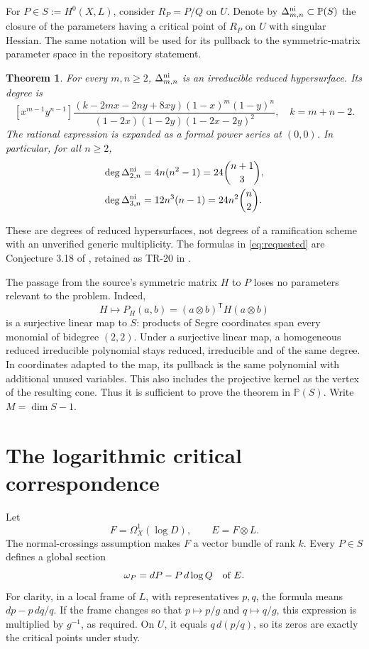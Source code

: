 \documentclass[11pt]{article}
\newtheorem{theorem}{Theorem}
\newcommand{\PP}{\mathbb P}
\begin{document}
For $P\in S:=H^0(X,L)$, consider $R_P=P/Q$ on $U$. Denote by
$\Delta^{\rm ni}_{m,n}\subset\PP(S)$ the closure of the parameters
having a critical point of $R_P$ on $U$ with singular Hessian.
The same notation will be used for its pullback to the symmetric-matrix
parameter space in the repository statement.

\begin{theorem}\label{thm:general}
For every $m,n\ge2$, $\Delta^{\rm ni}_{m,n}$ is an irreducible reduced
hypersurface. Its degree is
\begin{equation}\label{eq:general}
\boxed{
 [x^{m-1}y^{n-1}]
 \frac{(k-2mx-2ny+8xy)(1-x)^m(1-y)^n}
 {(1-2x)(1-2y)(1-2x-2y)^2},\quad k=m+n-2.
}
\end{equation}
The rational expression is expanded as a formal power series at $(0,0)$.
In particular, for all $n\ge2$,
\begin{equation}\label{eq:requested}
 \begin{split}
 \deg\Delta^{\rm ni}_{2,n}&=4n(n^2-1)=24\binom{n+1}{3},\\
 \deg\Delta^{\rm ni}_{3,n}&=12n^3(n-1)=24n^2\binom n2.
 \end{split}
\end{equation}
\end{theorem}

These are degrees of reduced hypersurfaces, not degrees of a
ramification scheme with an unverified generic multiplicity. The
formulas in \eqref{eq:requested} are Conjecture 3.18 of
\cite{BFHP}, retained as TR-20 in \cite{repo}.

The passage from the source's symmetric matrix $H$ to $P$ loses no
parameters relevant to the problem. Indeed,
\[
 H\longmapsto P_H(a,b)=(a\otimes b)^{\mathsf T}H(a\otimes b)
\]
is a surjective linear map to $S$: products of Segre coordinates
span every monomial of bidegree $(2,2)$. Under a surjective linear
map, a homogeneous reduced irreducible polynomial stays reduced,
irreducible and of the same degree. In coordinates adapted to the
map, its pullback is the same polynomial with additional unused
variables. This also includes the projective kernel as the vertex
of the resulting cone. Thus it is sufficient to prove the theorem
in $\PP(S)$. Write $M=\dim S-1$.

\section{The logarithmic critical correspondence}
Let
\[
 F=\Omega_X^1(\log D),\qquad E=F\otimes L.
\]
The normal-crossings assumption makes $F$ a vector bundle of rank $k$.
Every $P\in S$ defines a global section
\begin{equation}\label{eq:omega}
 \omega_P=dP-P\,d\log Q\quad\hbox{of }E.
\end{equation}
For clarity, in a local frame of $L$, with representatives $p,q$, the
formula means $dp-p\,dq/q$. If the frame changes so that
$p\mapsto p/g$ and $q\mapsto q/g$, this expression is multiplied by
$g^{-1}$, as required. On $U$, it equals $q\,d(p/q)$, so its zeros
are exactly the critical points under study.
\end{document}
